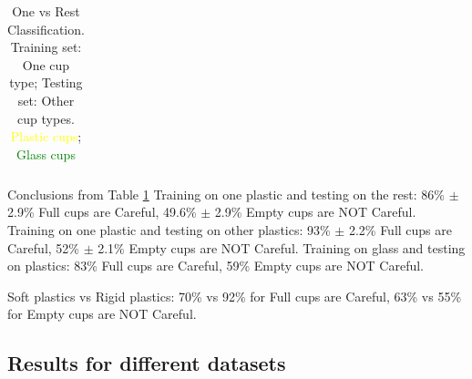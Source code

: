 \begin{table}
\begin{tabular}{l l c c c c c c}
\bottomrule %
\end{tabular}
\caption{One vs Rest Classification. Training set: One cup type; Testing set: Other cup types. \textcolor{Yellow}{Plastic cups}; \textcolor{Green}{Glass cups}}
\label{tab:one_vs_all} 
\end{table}

Conclusions from Table \ref{tab:one_vs_all} 
Training on one plastic and testing on the rest: 86\% $\pm$ 2.9\% Full cups are Careful, 49.6\% $\pm$ 2.9\% Empty cups are NOT Careful. Training on one plastic and testing on other plastics: 93\% $\pm$ 2.2\% Full cups are Careful, 52\% $\pm$ 2.1\% Empty cups are NOT Careful. Training on glass and testing on plastics: 83\% Full cups are Careful,	59\% Empty cups are NOT Careful.

Soft plastics vs Rigid plastics: 70\% vs 92\% for Full cups are Careful, 63\% vs 55\% for Empty cups are NOT Careful.

\subsection{Results for different datasets}




